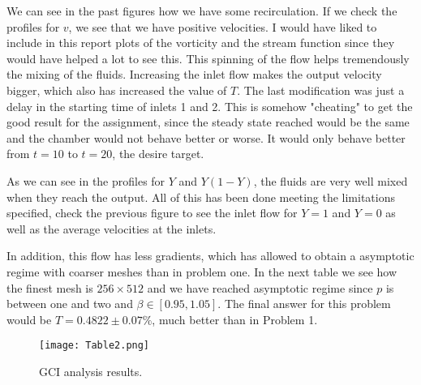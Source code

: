 We can see in the past figures how we have some recirculation. If we check the profiles for $v$, we see that we have positive velocities. I would have liked to include in this report plots of the vorticity and the stream function since they would have helped a lot to see this. This spinning of the flow helps tremendously the mixing of the fluids. Increasing the inlet flow makes the output velocity bigger, which also has increased the value of $T$. The last modification was just a delay in the starting time of inlets 1 and 2. This is somehow "cheating" to get the good result for the assignment, since the steady state reached would be the same and the chamber would not behave better or worse. It would only behave better from $t=10$ to $t=20$, the desire target.

As we can see in the profiles for $Y$ and $Y(1-Y)$, the fluids are very well mixed when they reach the output. All of this has been done meeting the limitations specified, check the previous figure to see the inlet flow for $Y=1$ and $Y=0$ as well as the average velocities at the inlets.

In addition, this flow has less gradients, which has allowed to obtain a asymptotic regime with coarser meshes than in problem one. In the next table we see how the finest mesh is $256\times 512$ and we have reached asymptotic regime since $p$ is between one and two and $\beta\in [0.95,1.05]$. The final answer for this problem would be $T=0.4822\pm 0.07\%$, much better than in Problem 1.

\begin{figure}[H]
\centering     %
\texttt{[image: Table2.png]}
\caption{GCI analysis results.}
\end{figure}
